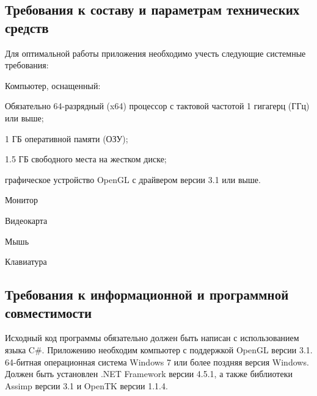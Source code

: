 \subsection{Требования к составу и параметрам технических средств}
Для оптимальной работы приложения необходимо учесть следующие системные требования:
\begin{my_enumerate}
\item Компьютер, оснащенный:
    \begin{my_enumerate}
    \item Обязательно 64-разрядный (x64) процессор с тактовой частотой 1 гигагерц (ГГц) или выше;
    \item 1 ГБ оперативной памяти (ОЗУ);
    \item 1.5 ГБ свободного места на жестком диске;
    \item графическое устройство OpenGL с драйвером версии 3.1 или выше.
    \end{my_enumerate}
\item Монитор
\item Видеокарта
\item Мышь
\item Клавиатура
\end{my_enumerate}


\subsection{Требования к информационной и программной совместимости}
Исходный код программы обязательно должен быть написан с использованием языка C\#. Приложению необходим компьютер с поддержкой OpenGL версии 3.1. 64-битная операционная система Windows 7 или более поздняя версия Windows. Должен быть установлен .NET Framework версии 4.5.1, а также библиотеки Assimp версии 3.1 и OpenTK версии 1.1.4.

